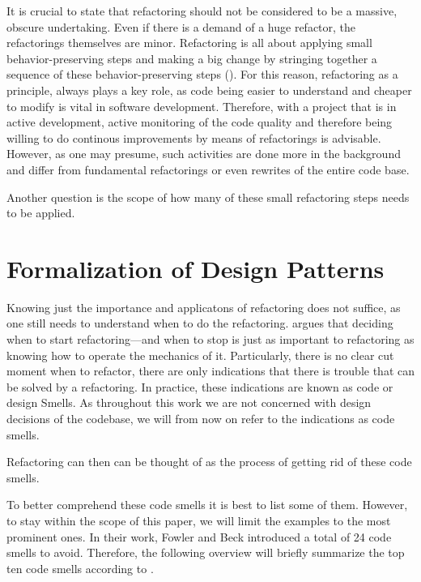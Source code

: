 It is crucial to state that refactoring should not be considered to be a massive, obscure undertaking.
Even if there is a demand of a huge refactor, the refactorings themselves are minor.
Refactoring is all about applying small behavior-preserving steps and making a big change by stringing together a sequence of these behavior-preserving steps (\cite[p.~45]{fowler2018}). 
For this reason, refactoring as a principle, 
	always plays a key role, 
	as code being easier to understand and cheaper to modify is vital in software development.
Therefore, with a project that is in active development, 
	active monitoring of the code quality and therefore being willing to do continous improvements 
	by means of refactorings is advisable.
However, as one may presume, such activities are done more in the background and differ from fundamental refactorings or even rewrites of the entire code base.

Another question is the scope of how many of these small refactoring steps needs to be applied.





\section{Formalization of Design Patterns}

Knowing just the importance and applicatons of refactoring does not suffice, 
	as one still needs to understand when to do the refactoring.
\textcite{fowler2018} argues that deciding when to start refactoring—and when to stop 
	is just as important to refactoring as knowing how to operate the mechanics of it.
Particularly, there is no clear cut moment when to refactor, 
	there are only indications that there is trouble that can be solved by a refactoring.
In practice, these indications are known as code or design Smells.
As throughout this work we are not concerned with design decisions of the codebase, 
	we will from now on refer to the indications as code smells.

Refactoring can then can be thought of as the process of getting rid of these code smells. 

To better comprehend these code smells it is best to list some of them. 
However, to stay within the scope of this paper, 
	we will limit the examples to the most prominent ones. 
In their work, Fowler and Beck introduced a total of 24 code smells to avoid.
Therefore, the following overview will briefly summarize the top ten code smells according to \textcite{lacerda2020}.

